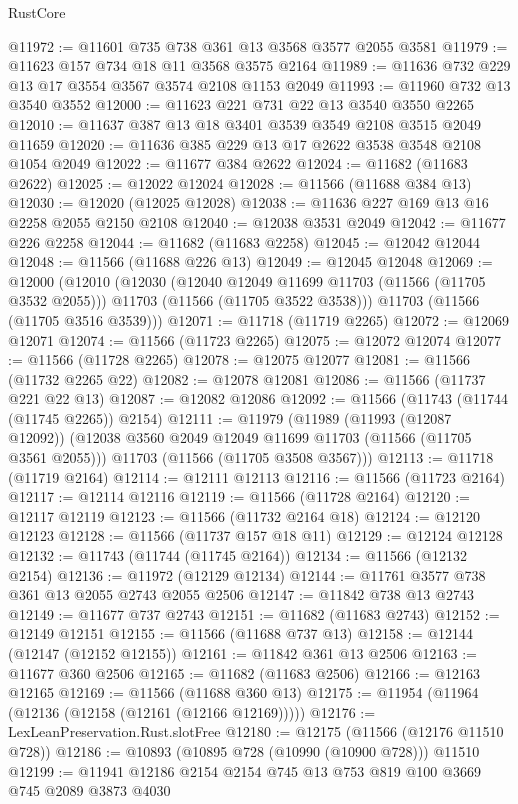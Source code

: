 \begin{lexlean}{RustCore}
\begin{coremodule}
@11972 := @11601 @735 @738 @361 @13 @3568 @3577 @2055 @3581
@11979 := @11623 @157 @734 @18 @11 @3568 @3575 @2164
@11989 := @11636 @732 @229 @13 @17 @3554 @3567 @3574 @2108 @1153 @2049
@11993 := @11960 @732 @13 @3540 @3552
@12000 := @11623 @221 @731 @22 @13 @3540 @3550 @2265
@12010 := @11637 @387 @13 @18 @3401 @3539 @3549 @2108 @3515 @2049 @11659
@12020 := @11636 @385 @229 @13 @17 @2622 @3538 @3548 @2108 @1054 @2049
@12022 := @11677 @384 @2622
@12024 := @11682 (@11683 @2622)
@12025 := @12022 @12024
@12028 := @11566 (@11688 @384 @13)
@12030 := @12020 (@12025 @12028)
@12038 := @11636 @227 @169 @13 @16 @2258 @2055 @2150 @2108
@12040 := @12038 @3531 @2049
@12042 := @11677 @226 @2258
@12044 := @11682 (@11683 @2258)
@12045 := @12042 @12044
@12048 := @11566 (@11688 @226 @13)
@12049 := @12045 @12048
@12069 := @12000
    (@12010
      (@12030
        (@12040 @12049 @11699 @11703 (@11566 (@11705 @3532 @2055)))
        @11703
        (@11566 (@11705 @3522 @3538)))
      @11703
      (@11566 (@11705 @3516 @3539)))
@12071 := @11718 (@11719 @2265)
@12072 := @12069 @12071
@12074 := @11566 (@11723 @2265)
@12075 := @12072 @12074
@12077 := @11566 (@11728 @2265)
@12078 := @12075 @12077
@12081 := @11566 (@11732 @2265 @22)
@12082 := @12078 @12081
@12086 := @11566 (@11737 @221 @22 @13)
@12087 := @12082 @12086
@12092 := @11566 (@11743 (@11744 (@11745 @2265)) @2154)
@12111 := @11979
    (@11989
      (@11993 (@12087 @12092))
      (@12038 @3560 @2049 @12049 @11699 @11703 (@11566 (@11705 @3561 @2055)))
      @11703
      (@11566 (@11705 @3508 @3567)))
@12113 := @11718 (@11719 @2164)
@12114 := @12111 @12113
@12116 := @11566 (@11723 @2164)
@12117 := @12114 @12116
@12119 := @11566 (@11728 @2164)
@12120 := @12117 @12119
@12123 := @11566 (@11732 @2164 @18)
@12124 := @12120 @12123
@12128 := @11566 (@11737 @157 @18 @11)
@12129 := @12124 @12128
@12132 := @11743 (@11744 (@11745 @2164))
@12134 := @11566 (@12132 @2154)
@12136 := @11972 (@12129 @12134)
@12144 := @11761 @3577 @738 @361 @13 @2055 @2743 @2055 @2506
@12147 := @11842 @738 @13 @2743
@12149 := @11677 @737 @2743
@12151 := @11682 (@11683 @2743)
@12152 := @12149 @12151
@12155 := @11566 (@11688 @737 @13)
@12158 := @12144 (@12147 (@12152 @12155))
@12161 := @11842 @361 @13 @2506
@12163 := @11677 @360 @2506
@12165 := @11682 (@11683 @2506)
@12166 := @12163 @12165
@12169 := @11566 (@11688 @360 @13)
@12175 := @11954 (@11964 (@12136 (@12158 (@12161 (@12166 @12169)))))
@12176 := LexLeanPreservation.Rust.slotFree
@12180 := @12175 (@11566 (@12176 @11510 @728))
@12186 := @10893 (@10895 @728 (@10990 (@10900 @728))) @11510
@12199 := @11941 @12186 @2154 @2154 @745 @13 @753 @819 @100 @3669 @745 @2089 @3873 @4030

\end{coremodule}
\end{lexlean}
